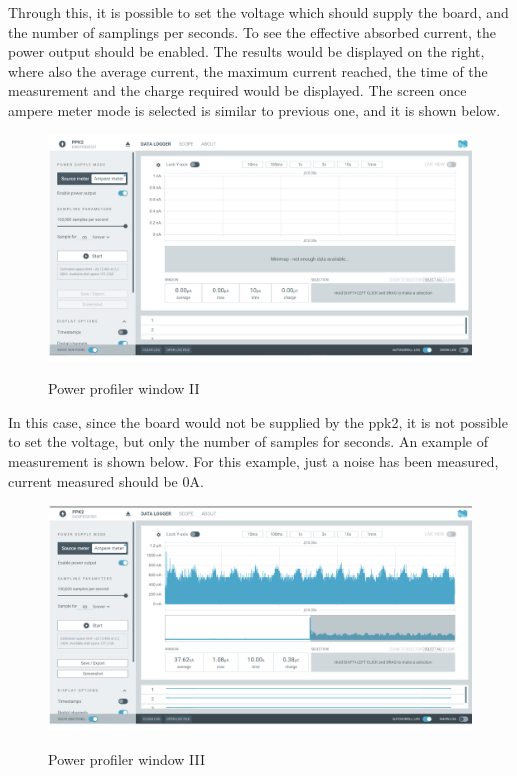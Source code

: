 \documentclass{Configuration_Files/PoliMi3i_thesis}
\begin{document}
Through this, it is possible to set the voltage which should supply the board, and the number of samplings per seconds. To see the effective absorbed current, the power output should be enabled. The results would be displayed on the right, where also the average current, the maximum current reached, the time of the measurement and the charge required would be displayed.
The screen once ampere meter mode is selected is similar to previous one, and it is shown below.

\begin{figure}[H]
    \centering
    \includegraphics[scale=0.6]{Test_Procedure/13.png}
    \label{direct_communication_board_PC_13}
    \caption{Power profiler window II}
\end{figure}

In this case, since the board would not be supplied by the ppk2, it is not possible to set the voltage, but only the number of samples for seconds.
An example of measurement is shown below. For this example, just a noise has been measured, current measured should be 0A. 

\begin{figure}[H]
    \centering
    \includegraphics[scale=0.6]{Test_Procedure/14.png}
    \label{direct_communication_board_PC_14}
    \caption{Power profiler window III}
\end{figure}
\end{document}
